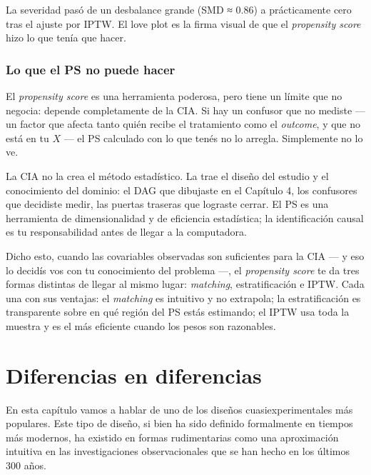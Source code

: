 \documentclass[
  letterpaper,
  DIV=11,
  numbers=noendperiod,
  oneside]{scrreprt}
\begin{document}
La severidad pasó de un desbalance grande (SMD ≈ 0.86) a prácticamente
cero tras el ajuste por IPTW. El love plot es la firma visual de que el
\emph{propensity score} hizo lo que tenía que hacer.

\hypertarget{lo-que-el-ps-no-puede-hacer}{%
\subsection{Lo que el PS no puede
hacer}\label{lo-que-el-ps-no-puede-hacer}}

El \emph{propensity score} es una herramienta poderosa, pero tiene un
límite que no negocia: depende completamente de la CIA. Si hay un
confusor que no mediste --- un factor que afecta tanto quién recibe el
tratamiento como el \emph{outcome}, y que no está en tu \(X\) --- el PS
calculado con lo que tenés no lo arregla. Simplemente no lo ve.

La CIA no la crea el método estadístico. La trae el diseño del estudio y
el conocimiento del dominio: el DAG que dibujaste en el Capítulo 4, los
confusores que decidiste medir, las puertas traseras que lograste
cerrar. El PS es una herramienta de dimensionalidad y de eficiencia
estadística; la identificación causal es tu responsabilidad antes de
llegar a la computadora.

Dicho esto, cuando las covariables observadas son suficientes para la
CIA --- y eso lo decidís vos con tu conocimiento del problema ---, el
\emph{propensity score} te da tres formas distintas de llegar al mismo
lugar: \emph{matching}, estratificación e IPTW. Cada una con sus
ventajas: el \emph{matching} es intuitivo y no extrapola; la
estratificación es transparente sobre en qué región del PS estás
estimando; el IPTW usa toda la muestra y es el más eficiente cuando los
pesos son razonables.


\hypertarget{sec-did}{%
\chapter{Diferencias en diferencias}\label{sec-did}}

En esta capítulo vamos a hablar de uno de los diseños
cuasiexperimentales más populares. Este tipo de diseño, si bien ha sido
definido formalmente en tiempos más modernos, ha existido en formas
rudimentarias como una aproximación intuitiva en las investigaciones
observacionales que se han hecho en los últimos 300 años.
\end{document}
